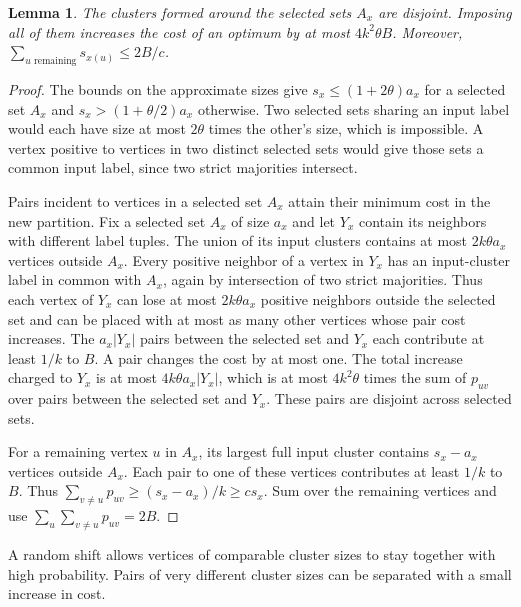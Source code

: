 \documentclass[11pt]{article}
\newtheorem{lemma}[theorem]{Lemma}
\begin{document}
\begin{lemma}\label{lem:centers}
The clusters formed around the selected sets $A_x$ are disjoint. Imposing all of them increases
the cost of an optimum by at most $4k^2\theta B$. Moreover,
$\sum_{u\text{ remaining}}s_{x(u)}\le2B/c$.
\end{lemma}
\begin{proof}
The bounds on the approximate sizes give $s_x\le(1+2\theta)a_x$ for a selected
set $A_x$ and $s_x>(1+\theta/2)a_x$ otherwise. Two selected sets sharing an input label
would each have size at most $2\theta$ times the other's size,
which is impossible. A vertex positive to vertices in two distinct selected sets would give
those sets a common input label, since two strict majorities
intersect.

Pairs incident to vertices in a selected set $A_x$ attain their minimum cost in the
new partition. Fix a selected set $A_x$ of size $a_x$ and let $Y_x$ contain its
neighbors with different label tuples. The union of its input clusters contains at
most $2k\theta a_x$ vertices outside $A_x$. Every positive neighbor
of a vertex in $Y_x$ has an input-cluster label in common with $A_x$, again by
intersection of two strict majorities. Thus each vertex of $Y_x$
can lose at most $2k\theta a_x$ positive neighbors outside the selected set
and can be placed with at most as many other vertices whose pair cost increases.
The $a_x|Y_x|$ pairs between the selected set and $Y_x$ each contribute at least $1/k$
to $B$. A pair changes the cost by at most one. The total increase charged
to $Y_x$ is at most $4k\theta a_x|Y_x|$, which is at most $4k^2\theta$
times the sum of $p_{uv}$ over pairs between the selected set and
$Y_x$. These pairs
are disjoint across selected sets.

For a remaining vertex $u$ in $A_x$, its largest full input cluster
contains $s_x-a_x$ vertices outside $A_x$. Each pair to one of
these vertices contributes at least $1/k$ to $B$. Thus
$\sum_{v\ne u}p_{uv}\ge(s_x-a_x)/k\ge c s_x$. Sum over the remaining
vertices and use $\sum_u\sum_{v\ne u}p_{uv}=2B$.
\end{proof}

A random shift allows vertices of comparable cluster sizes to stay
together with high probability. Pairs of very different cluster sizes
can be separated with a small increase in cost.
\end{document}
